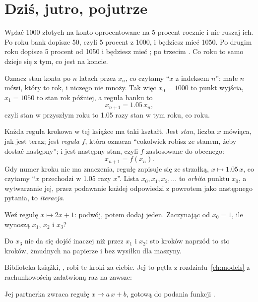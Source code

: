 \section{Dziś, jutro, pojutrze}
\label{sec:ch02-rule}

\noindent
Wpłać 1000 złotych na konto oprocentowane na 5 procent rocznie i nie ruszaj
ich. Po roku bank dopisze 50, czyli 5 procent z 1000, i będziesz mieć 1050.
Po drugim roku dopisze 5 procent od 1050 i będziesz mieć
; po trzecim . Co roku to samo
dzieje się z tym, co jest na koncie.

Oznacz stan konta po $n$ latach przez $x_n$, co czytamy \enquote{$x$ z
indeksem $n$}: małe $n$ mówi, który to rok, i niczego nie mnoży. Tak więc
$x_0 = 1000$ to punkt wyjścia, $x_1 = 1050$ to stan rok później, a reguła
banku to
\[ x_{n+1} = \num{1.05}\, x_n , \]
czyli stan w przyszłym roku to \num{1.05} razy stan w tym roku, co roku.

Każda reguła krokowa w tej książce ma taki kształt. Jest \emph{stan},
liczba $x$ mówiąca, jak jest teraz; jest \emph{reguła} $f$, która oznacza
\enquote{cokolwiek robisz ze stanem, żeby dostać następny}; i jest
następny stan, czyli $f$ zastosowane do obecnego:
\[ x_{n+1} = f(x_n) . \]
Gdy numer kroku nie ma znaczenia, regułę zapisuje się ze strzałką,
$x \mapsto \num{1.05}\,x$, co czytamy \enquote{$x$ przechodzi w \num{1.05}
razy $x$}. Lista $x_0, x_1, x_2, \ldots$ to \emph{orbita} punktu $x_0$, a
wytwarzanie jej, przez podawanie każdej odpowiedzi z powrotem jako
następnego pytania, to \emph{iteracja}.


\begin{think}
Weź regułę $x \mapsto 2x + 1$: podwój, potem dodaj jeden. Zaczynając od
$x_0 = 1$, ile wynoszą $x_1$, $x_2$ i $x_3$?
\end{think}
Do $x_3$ nie da się dojść inaczej niż przez $x_1$ i $x_2$: sto kroków
naprzód to sto kroków, żmudnych na papierze i bez wysiłku dla maszyny.

\begin{projectbox}[unbreakable]
Biblioteka książki, , robi te kroki za ciebie. Jej
 to pętla z rozdziału~\ref{ch:models} z rachunkowością
załatwioną raz na zawsze:


\noindent
Jej partnerka  zwraca regułę $x \mapsto a\,x + b$,
gotową do podania funkcji .
\end{projectbox}

